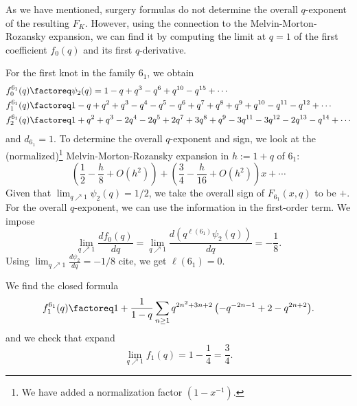 \documentclass[11pt,e-only]{amsart}
\begin{document}
As we have mentioned, surgery formulas do not determine the overall $q$-exponent of the resulting $F_K$. However, using the connection to the Melvin-Morton-Rozansky expansion, we can find it by computing the limit at $q=1$ of the first coefficient $f_0(q)$ and its first $q$-derivative.

\begin{example}\label{ex:FK-6_1} For the first knot in the family $6_1$, we obtain
\begin{equation}\label{eq:6_1-FK-coeffs}
\begin{split}
    f_0^{6_1}(q) &\factoreq \psi_2(q)= 1 - q + q^3 - q^6 + q^{10} - q^{15} +\cdots \\
    f_1^{6_1}(q) &\factoreq 1 - q + q^2 + q^3 - q^4 - q^5 - q^6 + q^7 + q^8 + q^9 + q^{10} - q^{11} - q^{12} + \cdots \\
    f_2^{6_1}(q) &\factoreq 1 + q^2 + q^3 - 2 q^4 - 2 q^5 + 2 q^7 + 3 q^8 + q^9 - 3 q^{11} - 3 q^{12} - 2 q^{13} - q^{14} + \cdots
\end{split}
\end{equation}
and $d_{6_1}=1$. To determine the overall $q$-exponent and sign, we look at the (normalized)\footnote{We have added a normalization factor $(1-x^{-1})$.} Melvin-Morton-Rozansky expansion in $h:=1+q$ of $6_1$:
\begin{equation}
   \left(\frac12- \frac{h}{8}+O(h^2)\right) + \left(\frac34 - \frac{h}{16}+O(h^2)\right) x + \cdots
\end{equation}
Given that $\lim_{q\nearrow 1}\psi_2(q)=1/2$, we take the overall sign of $F_{6_1}(x,q)$ to be $+$. For the overall $q$-exponent, we can use the information in the first-order term. We impose
\begin{equation}
    \lim_{q\nearrow 1} \frac{df_0(q)}{dq} = \lim_{q\nearrow 1} \frac{d\left(q^{\ell(6_1)} \psi_2(q)\right)}{dq}=-\frac18.
\end{equation}
Using $\lim_{q\nearrow1}\frac{d\psi_2}{dq}=-1/8$ \alert{cite}, we get $\ell(6_1)=0$. %

We find the closed formula
\begin{equation}
    f_1^{6_1}(q) \factoreq 1 + \frac{1}{1-q}\sum_{n\geq 1}{q^{2 n^2 + 3n + 2} \left(- q^{- 2 n-1} + 2 - q^{2 n+2}\right)}. %
\end{equation} %
 and we check that \alert{expand}
\begin{equation}
    \lim_{q\nearrow 1} f_1(q) = 1-\frac14 =  \frac{3}{4}.
\end{equation}


\end{example}
\end{document}

